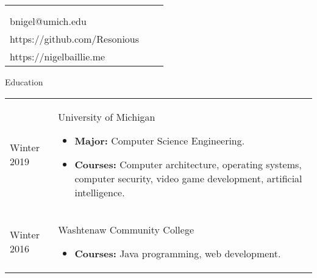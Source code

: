 \documentclass[11pt]{article}
\makeatletter
\def \address{Ann Arbor, MI}
\def \author{Nigel Baillie}
\def \email{bnigel@umich.edu}
\def \phonenumber{(734) 678-5328}
\def \github{https://github.com/Resonious}
\def \homepage{https://nigelbaillie.me}
\renewcommand{\section}[1]{{\Huge{#1}}\vspace{2 mm}}
\newenvironment{timeline}
        {\begin{tabular}{p{21 mm}|p{150 mm}}}
        {\end{tabular}}
\newenvironment{timelinetitle}
        {\vspace{-2 mm}\begin{large}}
        {\end{large}\vspace{-1.5 mm}}
\newcommand{\timespan}[2]{{#2}\newline{#1}}
\makeatother
\begin{document}
\newlength{\rcollength}\setlength{\rcollength}{3.0in}%
\begin{tabular} {
  p{}
  p{}
  p{}
}
  \begin{flushleft}
    {\Huge{\author}}\\
    \vspace{1.5 mm}
  \end{flushleft}
  &
  \begin{center}
    {\phonenumber}\\
    {\email}\\
    {\github}
  \end{center}
  &
  \begin{flushright}
    {\address}\\
    {\homepage}
  \end{flushright}
\end{tabular}

\section{Education}

\begin{timeline}
\timespan{Fall 2016}{Winter 2019}
&
\begin{timelinetitle}
    University of Michigan
\end{timelinetitle}
\begin{itemize}
  \item[] \textbf{Major:} Computer Science Engineering.
  \item[] \textbf{Courses:} Computer architecture, operating systems, computer security, video game development, artificial intelligence.
\end{itemize}

\\

Winter 2016
&
\begin{timelinetitle}
    Washtenaw Community College
\end{timelinetitle}
\begin{itemize}
  \item[] \textbf{Courses:} Java programming, web development.
\end{itemize}

\end{timeline}
\end{document}
